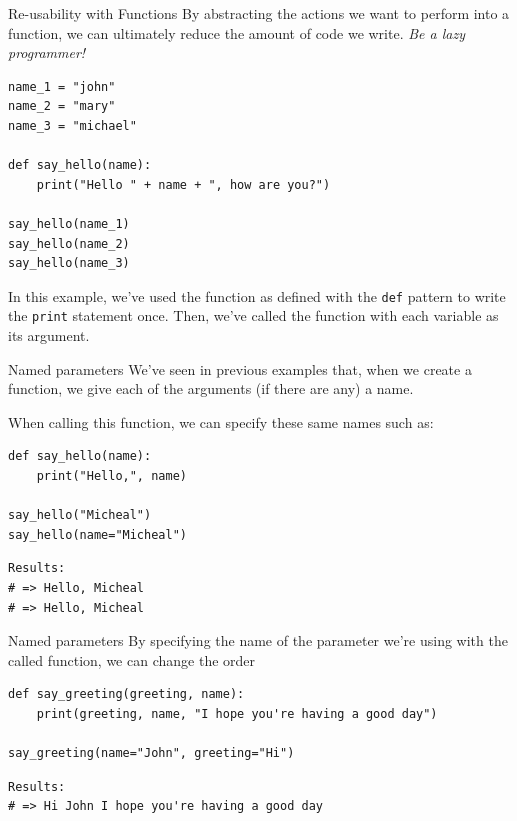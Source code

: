 \documentclass[10pt]{beamer}
\begin{document}
\begin{frame}[label={sec:org834e5a2},fragile]{Re-usability with Functions}
 By abstracting the actions we want to perform into a function, we can ultimately
reduce the amount of code we write. \emph{Be a lazy programmer!}

\begin{verbatim}
name_1 = "john"
name_2 = "mary"
name_3 = "michael"

def say_hello(name):
    print("Hello " + name + ", how are you?")

say_hello(name_1)
say_hello(name_2)
say_hello(name_3)
\end{verbatim}

In this example, we've used the function as defined with the \texttt{def} pattern to write
the \texttt{print} statement once. Then, we've called the function with each variable as its
argument.
\end{frame}

\begin{frame}[label={sec:orge8d7ecf},fragile]{Named parameters}
 We've seen in previous examples that, when we create a function, we give each of the
arguments (if there are any) a name.

When calling this function, we can specify these same names such as:

\begin{verbatim}
def say_hello(name):
    print("Hello,", name)

say_hello("Micheal")
say_hello(name="Micheal")
\end{verbatim}

\begin{verbatim}
Results: 
# => Hello, Micheal
# => Hello, Micheal
\end{verbatim}
\end{frame}

\begin{frame}[label={sec:org64b91cc},fragile]{Named parameters}
 By specifying the name of the parameter we're using with the called function, we can
change the order

\begin{verbatim}
def say_greeting(greeting, name):
    print(greeting, name, "I hope you're having a good day")

say_greeting(name="John", greeting="Hi")
\end{verbatim}

\begin{verbatim}
Results: 
# => Hi John I hope you're having a good day
\end{verbatim}
\end{frame}
\end{document}
